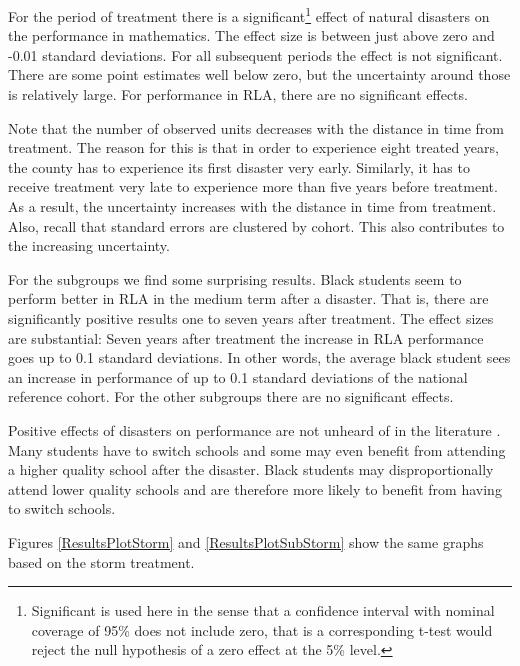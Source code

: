 For the period of treatment there is a significant\footnote{Significant is used here in the sense that a confidence interval with nominal coverage of 95\% does not include zero, that is a corresponding t-test would reject the null hypothesis of a zero effect at the 5\% level.} effect of natural disasters on the performance in mathematics. The effect size is between just above zero and -0.01 standard deviations. For all subsequent periods the effect is not significant. There are some point estimates well below zero, but the uncertainty around those is relatively large. For performance in RLA, there are no significant effects.

Note that the number of observed units decreases with the distance in time from treatment. The reason for this is that in order to experience eight treated years, the county has to experience its first disaster very early. Similarly, it has to receive treatment very late to experience more than five years before treatment. As a result, the uncertainty increases with the distance in time from treatment. Also, recall that standard errors are clustered by cohort. This also contributes to the increasing uncertainty.

For the subgroups we find some surprising results. Black students seem to perform better in RLA in the medium term after a disaster. That is, there are significantly positive results one to seven years after treatment. The effect sizes are substantial: Seven years after treatment the increase in RLA performance goes up to 0.1 standard deviations. In other words, the average black student sees an increase in performance of up to 0.1 standard deviations of the national reference cohort. For the other subgroups there are no significant effects.

Positive effects of disasters on performance are not unheard of in the literature \citep[see e.g.][]{Sacerdote_2012}. Many students have to switch schools and some may even benefit from attending a higher quality school after the disaster. Black students may disproportionally attend lower quality schools and are therefore more likely to benefit from having to switch schools. 

Figures \ref{ResultsPlotStorm} and \ref{ResultsPlotSubStorm} show the same graphs based on the storm treatment.


